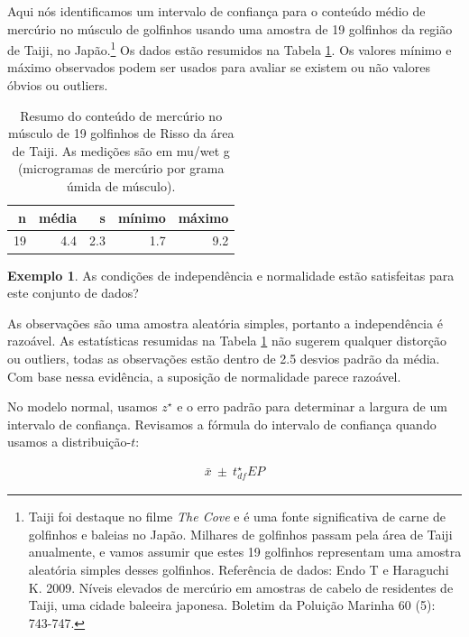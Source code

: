\documentclass[
]{book}
\theoremstyle{definition}
\theoremstyle{definition}
\newtheorem{example}{Exemplo}[chapter]
\theoremstyle{definition}
\theoremstyle{definition}
\theoremstyle{remark}
\begin{document}
Aqui nós identificamos um intervalo de confiança para o conteúdo médio de mercúrio no músculo de golfinhos usando uma amostra de 19 golfinhos da região de Taiji, no Japão.\footnote{Taiji foi destaque no filme \emph{The Cove} e é uma fonte significativa de carne de golfinhos e baleias no Japão. Milhares de golfinhos passam pela área de Taiji anualmente, e vamos assumir que estes 19 golfinhos representam uma amostra aleatória simples desses golfinhos. Referência de dados: Endo T e Haraguchi K. 2009. Níveis elevados de mercúrio em amostras de cabelo de residentes de Taiji, uma cidade baleeira japonesa. Boletim da Poluição Marinha 60 (5): 743-747.} Os dados estão resumidos na Tabela \ref{tab:summaryStatsOfHgInMuscleOfRissosDolphins}. Os valores mínimo e máximo observados podem ser usados para avaliar se existem ou não valores óbvios ou outliers.

\begin{table}

\caption{\label{tab:summaryStatsOfHgInMuscleOfRissosDolphins}Resumo do conteúdo de mercúrio no músculo de 19 golfinhos de Risso da área de Taiji. As medições são em mu/wet g (microgramas de mercúrio por grama úmida de músculo).}
\centering
\begin{tabular}[t]{r|r|r|r|r}
\hline
n & média & s & mínimo & máximo\\
\hline
19 & 4.4 & 2.3 & 1.7 & 9.2\\
\hline
\end{tabular}
\end{table}

\begin{example}
\protect\hypertarget{exm:unnamed-chunk-192}{}{\label{exm:unnamed-chunk-192} }As condições de independência e normalidade estão satisfeitas para este conjunto de dados?
\end{example}

As observações são uma amostra aleatória simples, portanto a independência é razoável. As estatísticas resumidas na Tabela \ref{tab:summaryStatsOfHgInMuscleOfRissosDolphins} não sugerem qualquer distorção ou outliers, todas as observações estão dentro de 2.5 desvios padrão da média. Com base nessa evidência, a suposição de normalidade parece razoável.

No modelo normal, usamos \(z ^ {\star}\) e o erro padrão para determinar a largura de um intervalo de confiança. Revisamos a fórmula do intervalo de confiança quando usamos a distribuição-\(t\):

\begin{eqnarray*}
\bar{x} \ \pm\  t^{\star}_{df}EP
\label{eq:eqt}
\end{eqnarray*}
\end{document}
